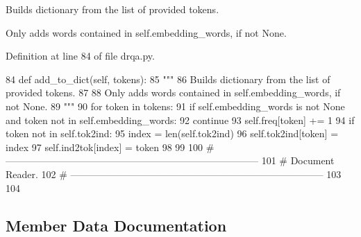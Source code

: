 \begin{DoxyVerb}Builds dictionary from the list of provided tokens.

Only adds words contained in self.embedding_words, if not None.
\end{DoxyVerb}
 

Definition at line 84 of file drqa.\+py.


\begin{DoxyCode}
84     \textcolor{keyword}{def }add\_to\_dict(self, tokens):
85         \textcolor{stringliteral}{"""}
86 \textcolor{stringliteral}{        Builds dictionary from the list of provided tokens.}
87 \textcolor{stringliteral}{}
88 \textcolor{stringliteral}{        Only adds words contained in self.embedding\_words, if not None.}
89 \textcolor{stringliteral}{        """}
90         \textcolor{keywordflow}{for} token \textcolor{keywordflow}{in} tokens:
91             \textcolor{keywordflow}{if} self.embedding\_words \textcolor{keywordflow}{is} \textcolor{keywordflow}{not} \textcolor{keywordtype}{None} \textcolor{keywordflow}{and} token \textcolor{keywordflow}{not} \textcolor{keywordflow}{in} self.embedding\_words:
92                 \textcolor{keywordflow}{continue}
93             self.freq[token] += 1
94             \textcolor{keywordflow}{if} token \textcolor{keywordflow}{not} \textcolor{keywordflow}{in} self.tok2ind:
95                 index = len(self.tok2ind)
96                 self.tok2ind[token] = index
97                 self.ind2tok[index] = token
98 
99 
100 \textcolor{comment}{# ------------------------------------------------------------------------------}
101 \textcolor{comment}{# Document Reader.}
102 \textcolor{comment}{# ------------------------------------------------------------------------------}
103 
104 
\end{DoxyCode}


\subsection{Member Data Documentation}
\mbox{\label{classparlai_1_1agents_1_1drqa_1_1drqa_1_1SimpleDictionaryAgent_a26ce0c0cc3362b43219d488826c3550a}} 
